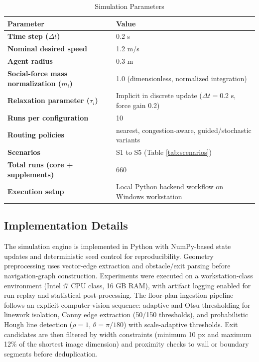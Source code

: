 \documentclass[utf8]{FrontiersinHarvard}
\begin{document}
\begin{table}[t]
\centering
\caption{Simulation Parameters}
\label{tab:sim_params}
{\footnotesize
\setlength{\tabcolsep}{3pt}
\begin{tabular}{>{\bfseries}p{2.25cm} p{4.55cm}}
\toprule
Parameter & Value \\
\midrule
Time step ($\Delta t$) & 0.2 s \\
Nominal desired speed & 1.2 m/s \\
Agent radius & 0.3 m \\
Social-force mass normalization ($m_i$) & 1.0 (dimensionless, normalized integration) \\
Relaxation parameter ($\tau_i$) & Implicit in discrete update ($\Delta t=0.2$ s, force gain 0.2) \\
Runs per configuration & 10 \\
Routing policies & nearest, congestion-aware, guided/stochastic variants \\
Scenarios & S1 to S5 (Table \ref{tab:scenarios}) \\
Total runs (core + supplements) & 660 \\
Execution setup & Local Python backend workflow on Windows workstation \\
\bottomrule
\end{tabular}
}
\end{table}

\subsection{Implementation Details}
The simulation engine is implemented in Python with NumPy-based state updates and deterministic seed control for reproducibility. Geometry preprocessing uses vector-edge extraction and obstacle/exit parsing before navigation-graph construction. Experiments were executed on a workstation-class environment (Intel i7 CPU class, 16 GB RAM), with artifact logging enabled for run replay and statistical post-processing.
The floor-plan ingestion pipeline follows an explicit computer-vision sequence: adaptive and Otsu thresholding for linework isolation, Canny edge extraction (50/150 thresholds), and probabilistic Hough line detection ($\rho=1$, $\theta=\pi/180$) with scale-adaptive thresholds. Exit candidates are then filtered by width constraints (minimum 10 px and maximum 12\% of the shortest image dimension) and proximity checks to wall or boundary segments before deduplication.
\end{document}
